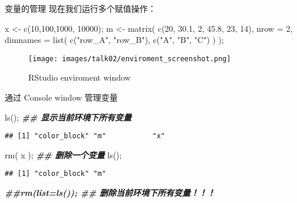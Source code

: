 \documentclass[ignorenonframetext,]{beamer}
\newenvironment{Shaded}{\begin{snugshade}}{\end{snugshade}}
\newcommand{\AttributeTok}[1]{\textcolor[rgb]{0.77,0.63,0.00}{#1}}
\newcommand{\DecValTok}[1]{\textcolor[rgb]{0.00,0.00,0.81}{#1}}
\newcommand{\DocumentationTok}[1]{\textcolor[rgb]{0.56,0.35,0.01}{\textbf{\textit{#1}}}}
\newcommand{\FloatTok}[1]{\textcolor[rgb]{0.00,0.00,0.81}{#1}}
\newcommand{\FunctionTok}[1]{\textcolor[rgb]{0.00,0.00,0.00}{#1}}
\newcommand{\NormalTok}[1]{#1}
\newcommand{\OtherTok}[1]{\textcolor[rgb]{0.56,0.35,0.01}{#1}}
\newcommand{\StringTok}[1]{\textcolor[rgb]{0.31,0.60,0.02}{#1}}
\newcommand\FontSmall{\fontsize{7}{8}\selectfont}
\begin{document}
\begin{frame}[fragile]{变量的管理}
\protect\hypertarget{ux53d8ux91cfux7684ux7ba1ux7406}{}
现在我们运行多个赋值操作：

\FontSmall

\begin{Shaded}
\begin{Highlighting}[]
\NormalTok{x }\OtherTok{\textless{}{-}} \FunctionTok{c}\NormalTok{(}\DecValTok{10}\NormalTok{,}\DecValTok{100}\NormalTok{,}\DecValTok{1000}\NormalTok{, }\DecValTok{10000}\NormalTok{);}
\NormalTok{m }\OtherTok{\textless{}{-}} \FunctionTok{matrix}\NormalTok{( }\FunctionTok{c}\NormalTok{(}\DecValTok{20}\NormalTok{, }\FloatTok{30.1}\NormalTok{, }\DecValTok{2}\NormalTok{, }\FloatTok{45.8}\NormalTok{, }\DecValTok{23}\NormalTok{, }\DecValTok{14}\NormalTok{), }\AttributeTok{nrow =} \DecValTok{2}\NormalTok{, }
       \AttributeTok{dimnames =} \FunctionTok{list}\NormalTok{( }\FunctionTok{c}\NormalTok{(}\StringTok{"row\_A"}\NormalTok{, }\StringTok{"row\_B"}\NormalTok{), }\FunctionTok{c}\NormalTok{(}\StringTok{"A"}\NormalTok{, }\StringTok{"B"}\NormalTok{, }\StringTok{"C"}\NormalTok{) ) );}
\end{Highlighting}
\end{Shaded}

\begin{figure}
\centering
\texttt{[image: images/talk02/enviroment\_screenshot.png]}
\caption{RStudio enviroment window}
\end{figure}
\end{frame}

\begin{frame}[fragile]{通过 Console window 管理变量}
\protect\hypertarget{ux901aux8fc7-console-window-ux7ba1ux7406ux53d8ux91cf}{}
\FontSmall

\begin{Shaded}
\begin{Highlighting}[]
\FunctionTok{ls}\NormalTok{();  }\DocumentationTok{\#\# 显示当前环境下所有变量}
\end{Highlighting}
\end{Shaded}

\begin{verbatim}
## [1] "color_block" "m"           "x"
\end{verbatim}

\begin{Shaded}
\begin{Highlighting}[]
\FunctionTok{rm}\NormalTok{( x ); }\DocumentationTok{\#\# 删除一个变量}
\FunctionTok{ls}\NormalTok{(); }
\end{Highlighting}
\end{Shaded}

\begin{verbatim}
## [1] "color_block" "m"
\end{verbatim}

\begin{Shaded}
\begin{Highlighting}[]
\DocumentationTok{\#\#rm(list=ls()); \#\# 删除当前环境下所有变量！！！ }
\end{Highlighting}
\end{Shaded}
\end{frame}
\end{document}
